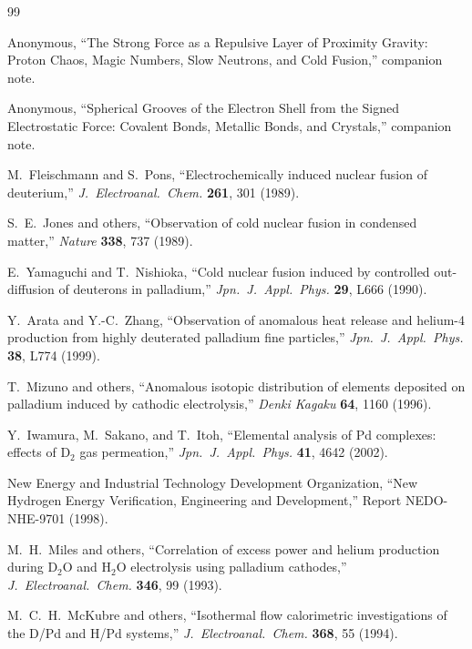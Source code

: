 \documentclass[a4paper]{article}
\begin{document}
\begin{thebibliography}{99}

Anonymous,
``The Strong Force as a Repulsive Layer of Proximity Gravity: Proton Chaos, Magic Numbers, Slow Neutrons, and Cold Fusion,''
companion note.

Anonymous,
``Spherical Grooves of the Electron Shell from the Signed Electrostatic Force: Covalent Bonds, Metallic Bonds, and Crystals,''
companion note.

M.~Fleischmann and S.~Pons,
``Electrochemically induced nuclear fusion of deuterium,''
\textit{J.~Electroanal.~Chem.} \textbf{261}, 301 (1989).

S.~E.~Jones and others,
``Observation of cold nuclear fusion in condensed matter,''
\textit{Nature} \textbf{338}, 737 (1989).

E.~Yamaguchi and T.~Nishioka,
``Cold nuclear fusion induced by controlled out-diffusion of deuterons in palladium,''
\textit{Jpn.~J.~Appl.~Phys.} \textbf{29}, L666 (1990).

Y.~Arata and Y.-C.~Zhang,
``Observation of anomalous heat release and helium-4 production from highly deuterated palladium fine particles,''
\textit{Jpn.~J.~Appl.~Phys.} \textbf{38}, L774 (1999).

T.~Mizuno and others,
``Anomalous isotopic distribution of elements deposited on palladium induced by cathodic electrolysis,''
\textit{Denki Kagaku} \textbf{64}, 1160 (1996).

Y.~Iwamura, M.~Sakano, and T.~Itoh,
``Elemental analysis of Pd complexes: effects of D\(_{2}\) gas permeation,''
\textit{Jpn.~J.~Appl.~Phys.} \textbf{41}, 4642 (2002).

New Energy and Industrial Technology Development Organization,
``New Hydrogen Energy Verification, Engineering and Development,''
Report NEDO-NHE-9701 (1998).

M.~H.~Miles and others,
``Correlation of excess power and helium production during D\(_{2}\)O and H\(_{2}\)O electrolysis using palladium cathodes,''
\textit{J.~Electroanal.~Chem.} \textbf{346}, 99 (1993).

M.~C.~H.~McKubre and others,
``Isothermal flow calorimetric investigations of the D/Pd and H/Pd systems,''
\textit{J.~Electroanal.~Chem.} \textbf{368}, 55 (1994).


\end{thebibliography}
\end{document}
